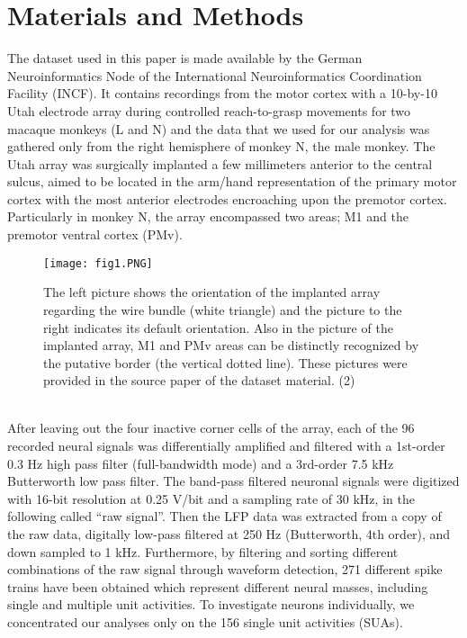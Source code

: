 \documentclass[9pt,twocolumn]{paper-template}
\begin{document}
\section*{Materials and Methods}
The dataset used in this paper is made available by the German Neuroinformatics Node of the International Neuroinformatics Coordination Facility (INCF). It contains recordings from the motor cortex with a 10-by-10 Utah electrode array during controlled reach-to-grasp movements for two macaque monkeys (L and N) and the data that we used for our analysis was gathered only from the right hemisphere of monkey N, the male monkey. The Utah array was surgically implanted a few millimeters anterior to the central sulcus, aimed to be located in the arm/hand representation of the primary motor cortex with the most anterior electrodes encroaching upon the premotor cortex. Particularly in monkey N, the array encompassed two areas; M1 and the premotor ventral cortex (PMv).\\
\begin{figure}%
\centering
\texttt{[image: fig1.PNG]}
\caption{The left picture shows the orientation of the implanted array regarding the wire bundle (white triangle) and the picture to the right indicates its default orientation. Also in the picture of the implanted array, M1 and PMv areas can be distinctly recognized by the putative border (the vertical dotted line). These pictures were provided in the source paper of the dataset material. (2) }
\label{fig:frog}
\end{figure}
\\
After leaving out the four inactive corner cells of the array, each of the 96 recorded neural signals was differentially amplified and filtered with a 1st-order 0.3 Hz high pass filter (full-bandwidth mode) and a 3rd-order 7.5 kHz Butterworth low pass filter. The band-pass filtered neuronal signals were digitized with 16-bit resolution at 0.25 V/bit and a sampling rate of 30 kHz, in the following called “raw signal”. Then the LFP data was extracted from a copy of the raw data, digitally low-pass filtered at 250 Hz (Butterworth, 4th order), and down sampled to 1 kHz. Furthermore, by filtering and sorting different combinations of the raw signal through waveform detection, 271 different spike trains have been obtained which represent different neural masses, including single and multiple unit activities. To investigate neurons individually, we concentrated our analyses only on the 156 single unit activities (SUAs).
\\
\end{document}
